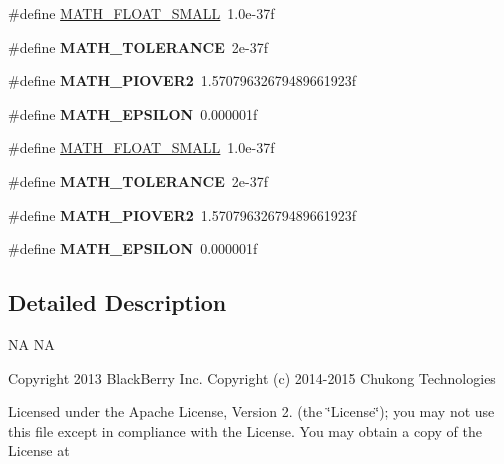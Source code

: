 \begin{DoxyCompactItemize}
\item 
\#define \hyperlink{group__base_ga6f2a4ca36ef6be8a5066d3cba2a783d6}{M\+A\+T\+H\+\_\+\+F\+L\+O\+A\+T\+\_\+\+S\+M\+A\+LL}~1.\+0e-\/37f
\item 
\mbox{\label{group__base_ga4e04e7539288cb3368801815f19628dc}} 
\#define {\bfseries M\+A\+T\+H\+\_\+\+T\+O\+L\+E\+R\+A\+N\+CE}~2e-\/37f
\item 
\mbox{\label{group__base_gaf1ad3d6a81f0afcf4c9805c600009ea6}} 
\#define {\bfseries M\+A\+T\+H\+\_\+\+P\+I\+O\+V\+E\+R2}~1.\+57079632679489661923f
\item 
\mbox{\label{group__base_gaf5c9d91107dc710f9abfa42cf2be2e6f}} 
\#define {\bfseries M\+A\+T\+H\+\_\+\+E\+P\+S\+I\+L\+ON}~0.\+000001f
\end{DoxyCompactItemize}
\begin{DoxyCompactItemize}
\item 
\#define \hyperlink{group__base_ga6f2a4ca36ef6be8a5066d3cba2a783d6}{M\+A\+T\+H\+\_\+\+F\+L\+O\+A\+T\+\_\+\+S\+M\+A\+LL}~1.\+0e-\/37f
\item 
\mbox{\label{group__base_ga4e04e7539288cb3368801815f19628dc}} 
\#define {\bfseries M\+A\+T\+H\+\_\+\+T\+O\+L\+E\+R\+A\+N\+CE}~2e-\/37f
\item 
\mbox{\label{group__base_gaf1ad3d6a81f0afcf4c9805c600009ea6}} 
\#define {\bfseries M\+A\+T\+H\+\_\+\+P\+I\+O\+V\+E\+R2}~1.\+57079632679489661923f
\item 
\mbox{\label{group__base_gaf5c9d91107dc710f9abfa42cf2be2e6f}} 
\#define {\bfseries M\+A\+T\+H\+\_\+\+E\+P\+S\+I\+L\+ON}~0.\+000001f
\end{DoxyCompactItemize}


\subsection{Detailed Description}
NA  NA

Copyright 2013 Black\+Berry Inc. Copyright (c) 2014-\/2015 Chukong Technologies

Licensed under the Apache License, Version 2. (the \char`\"{}\+License\char`\"{}); you may not use this file except in compliance with the License. You may obtain a copy of the License at

